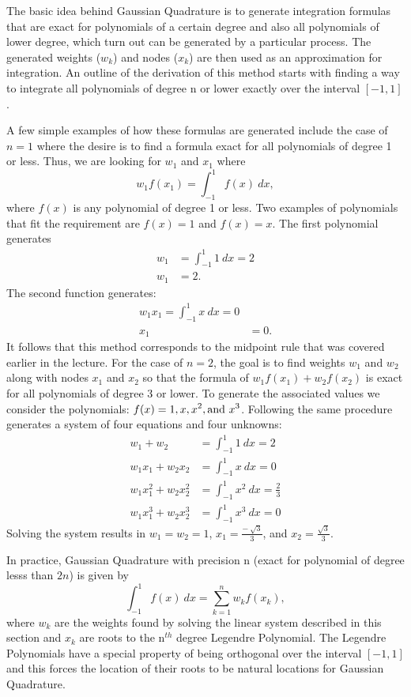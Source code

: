\documentclass[twoside]{article}
\def\ds{\displaystyle}
\begin{document}
The basic idea behind Gaussian Quadrature is to generate integration formulas that are exact for polynomials of a certain degree and also all polynomials of lower degree, which turn out can be generated by a particular process. The generated  weights ($\ds w_k$) and nodes ($\ds x_k$) are then used as an approximation for integration. An outline of the derivation of this method starts with finding a way to integrate all polynomials of degree n or lower exactly over the interval $[-1,1]$. 

A few simple examples of how these formulas are generated include the case of $n=1$ where the desire is to find a formula exact for all polynomials of degree 1 or less. Thus, we are looking for $\ds w_1$ and $x_1$ where
$$w_1 f(x_1) = \int_{-1}^1f(x) \ dx, $$
where $f(x)$ is any polynomial of degree 1 or less. Two examples of polynomials that fit the requirement are $f(x) =1$ and $f(x)=x$. The first polynomial generates
\begin{align*}
    w_1 &= \int_{-1}^1 1 \ dx=2 \\
    w_1 &= 2.
\end{align*}
The second function generates:
\begin{align*}
    w_1x_1 = \int_{-1}^1 x \ dx=0 \\
    x_1 &= 0.
\end{align*}
It follows that this method corresponds to the midpoint rule that was covered earlier in the lecture. For the case of $n=2$, the goal is to find weights $\ds w_1$ and $\ds w_2$ along with nodes $\ds x_1$ and $\ds x_2$ so that the formula of $w_1 f(x_1) + w_2 f(x_2)$ is exact for all polynomials of degree 3 or lower. To generate the associated values we consider the polynomials: $\ds f(x) = 1, x, x^2, {\rm and} \ x^3$. Following the same procedure generates a system of four equations and four unknowns:
\begin{align*}
w_1 + w_2 &= \int_{-1}^1 1 \ dx = 2 \\
w_1 x_1 + w_2 x_2 &= \int_{-1}^1 x \ dx = 0 \\
w_1 x_1^2 + w_2 x_2^2 &= \int_{-1}^1 x^2 \ dx = \frac 23 \\
w_1 x_1^3 + w_2 x_2^3 &= \int_{-1}^1 x^3 \ dx = 0 
\end{align*}
Solving the system results in $\ds w_1 = w_2 = 1$, $\ds x_1 = \frac {-\ \sqrt{3}}3$, and $\ds x_2 = \frac {\sqrt{3}}3$.

In practice, Gaussian Quadrature with precision n (exact for polynomial of degree lesss than $2n$) is given by 
$$\int_{-1}^1 f(x) \ dx = \sum_{k=1}^n w_k f(x_k),$$
where $\ds w_k$ are the weights found by solving the linear system described in this section and $\ds x_k$ are roots to the n$\ds ^{th}$ degree Legendre Polynomial. The Legendre Polynomials have a special property of being orthogonal over the interval $[-1,1]$ and this forces the location of their roots to be natural locations for Gaussian Quadrature. 
\end{document}
